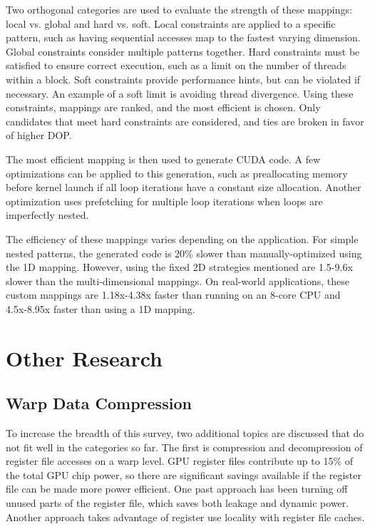 \documentclass[prodmode,acmtecs]{acmsmall} %
\begin{document}
Two orthogonal categories are used to evaluate the strength of these mappings:
local vs. global and hard vs. soft. Local constraints are applied to a specific
pattern, such as having sequential accesses map to the fastest varying
dimension. Global constraints consider multiple patterns together. Hard
constraints must be satisfied to ensure correct execution, such as a limit on
the number of threads within a block. Soft constraints provide performance
hints, but can be violated if necessary. An example of a soft limit is avoiding
thread divergence. Using these constraints, mappings are ranked, and the most
efficient is chosen. Only candidates that meet hard constraints are considered,
and ties are broken in favor of higher DOP.

The most efficient mapping is then used to generate CUDA code. A few
optimizations can be applied to this generation, such as preallocating memory
before kernel launch if all loop iterations have a constant size allocation.
Another optimization uses prefetching for multiple loop iterations when loops
are imperfectly nested.

The efficiency of these mappings varies depending on the application. For simple
nested patterns, the generated code is 20\% slower than manually-optimized using
the 1D mapping. However, using the fixed 2D strategies mentioned are 1.5-9.6x
slower than the multi-dimensional mappings. On real-world applications, these
custom mappings are 1.18x-4.38x faster than running on an 8-core CPU and
4.5x-8.95x faster than using a 1D mapping.

\section{Other Research} \label{sec:memory}
\subsection{Warp Data Compression}
To increase the breadth of this survey, two additional topics are discussed that
do not fit well in the categories so far. The first is compression and
decompression of register file accesses on a warp level. GPU register files
contribute up to 15\% of the total GPU chip power, so there are significant
savings available if the register file can be made more power efficient. One
past approach has been turning off unused parts of the register file, which
saves both leakage and dynamic power. Another approach takes advantage of
register use locality with register file caches.
\end{document}
